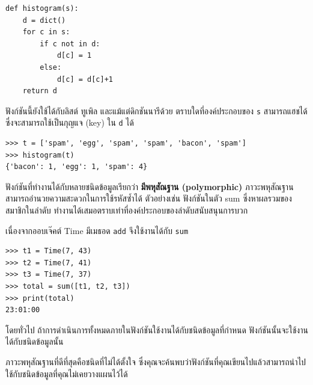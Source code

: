 \begin{verbatim}
def histogram(s):
    d = dict()
    for c in s:
        if c not in d:
            d[c] = 1
        else:
            d[c] = d[c]+1
    return d
\end{verbatim}
%

ฟังก์ชันนี้ยังใช้ได้กับลิสต์ ทูเพิล และแม้แต่ดิกชันนารีด้วย ตราบใดที่องค์ประกอบของ {\tt s} สามารถแฮชได้ ซึ่งจะสามารถใช้เป็นกุญแจ (key) ใน {\tt d} ได้

\begin{verbatim}
>>> t = ['spam', 'egg', 'spam', 'spam', 'bacon', 'spam']
>>> histogram(t)
{'bacon': 1, 'egg': 1, 'spam': 4}
\end{verbatim}
%

ฟังก์ชันที่ทำงานได้กับหลายชนิดข้อมูลเรียกว่า {\bf มีพหุสัณฐาน (polymorphic)} 
ภาวะพหุสัณฐานสามารถอำนวยความสะดวกในการใช้รหัสซ้ำได้ ตัวอย่างเช่น ฟังก์ชันในตัว sum ซึ่งหาผลรวมของสมาชิกในลำดับ ทำงานได้เสมอตราบเท่าที่องค์ประกอบของลำดับสนับสนุนการบวก


เนื่องจากออบเจ๊คต์ Time มีเมธอด {\tt add} จึงใช้งานได้กับ {\tt sum}

\begin{verbatim}
>>> t1 = Time(7, 43)
>>> t2 = Time(7, 41)
>>> t3 = Time(7, 37)
>>> total = sum([t1, t2, t3])
>>> print(total)
23:01:00
\end{verbatim}
%

โดยทั่วไป ถ้าการดำเนินการทั้งหมดภายในฟังก์ชันใช้งานได้กับชนิดข้อมูลที่กำหนด ฟังก์ชันนั้นจะใช้งานได้กับชนิดข้อมูลนั้น


ภาวะพหุสัณฐานที่ดีที่สุดคือชนิดที่ไม่ได้ตั้งใจ ซึ่งคุณจะค้นพบว่าฟังก์ชันที่คุณเขียนไปแล้วสามารถนำไปใช้กับชนิดข้อมูลที่คุณไม่เคยวางแผนไว้ได้

